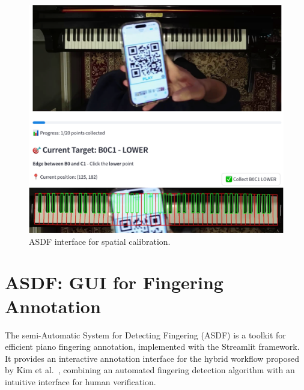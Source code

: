 \documentclass{article}
\begin{document}


\begin{figure}
    \centering
    \includegraphics[width=\linewidth]{Images/ASDF_keyboard.png}
    \caption{ASDF interface for spatial calibration.}
    \label{fig:asdfkeyboard}  
    \vspace{-5mm}
\end{figure}

\section{ASDF: GUI for Fingering Annotation}
The semi-Automatic System for Detecting Fingering (ASDF) is a toolkit for efficient piano fingering annotation, implemented with the Streamlit framework. It provides an interactive annotation interface for the hybrid workflow proposed by Kim et al.~\cite{kim2025pianovam}, combining an automated fingering detection algorithm with an intuitive interface for human verification.
\end{document}
